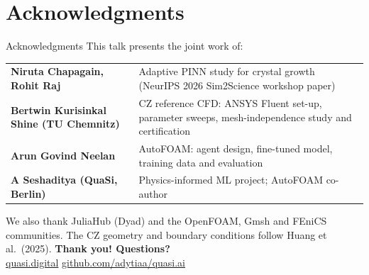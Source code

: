 \documentclass[aspectratio=169,10pt,t]{beamer}
\newcommand{\weblink}[2]{\href{#1}{\textcolor{qblue}{#2}}}
\begin{document}
\section{Acknowledgments}
\begin{frame}{Acknowledgments}
\small This talk presents the joint work of:\\[2mm]
\renewcommand{\arraystretch}{1.3}
\begin{tabularx}{\textwidth}{@{}>{\bfseries}l L@{}}
\toprule
Niruta Chapagain, Rohit Raj & Adaptive PINN study for crystal growth (NeurIPS 2026 Sim2Science workshop paper) \\
Bertwin Kurisinkal Shine (TU Chemnitz) & CZ reference CFD: ANSYS Fluent set-up, parameter sweeps, mesh-independence study and certification \\
Arun Govind Neelan & AutoFOAM: agent design, fine-tuned model, training data and evaluation \\
A Seshaditya (QuaSi, Berlin) & Physics-informed ML project; AutoFOAM co-author \\
\bottomrule
\end{tabularx}
\vspace{2mm}

\footnotesize We also thank JuliaHub (Dyad) and the OpenFOAM, Gmsh and FEniCS communities. The CZ geometry and boundary conditions follow Huang et al.\ (2025).
\vfill
\centering
{\Large\textcolor{qblue}{\textbf{Thank you! Questions?}}}\\[1mm]
\footnotesize\weblink{https://quasi.digital}{quasi.digital}\quad
\weblink{https://github.com/adytiaa/quasi.ai}{github.com/adytiaa/quasi.ai}
\vspace{2mm}
\end{frame}
\end{document}
